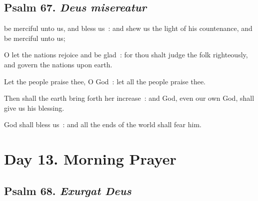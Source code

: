 \clearpage
\subsection{Psalm 67. \textit{Deus misereatur}}

 be merciful unto us, and bless us~: and shew us the light of his countenance, and be merciful unto us;\par
{}
O let the nations rejoice and be glad~: for thou shalt judge the folk righteously, and govern the nations upon earth.\par
{}Let the people praise thee, O God~: let all the people praise thee.\par
{}Then shall the earth bring forth her increase~: and God, even our own God, shall give us his blessing.\par
{}God shall bless us~: and all the ends of the world shall fear him.\par

\section*{Day 13. Morning Prayer}

\subsection{Psalm 68. \textit{Exurgat Deus}}

